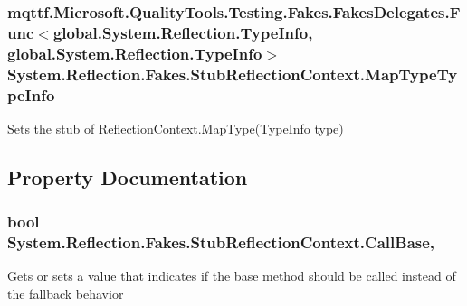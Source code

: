 \hypertarget{class_system_1_1_reflection_1_1_fakes_1_1_stub_reflection_context_a1d6b6e2142724c81acddba1c57b04350}{
\subsubsection[{Map\-Type\-Type\-Info}]{\setlength{\rightskip}{0pt plus 5cm}mqttf.\-Microsoft.\-Quality\-Tools.\-Testing.\-Fakes.\-Fakes\-Delegates.\-Func$<$global.\-System.\-Reflection.\-Type\-Info, global.\-System.\-Reflection.\-Type\-Info$>$ System.\-Reflection.\-Fakes.\-Stub\-Reflection\-Context.\-Map\-Type\-Type\-Info}}\label{class_system_1_1_reflection_1_1_fakes_1_1_stub_reflection_context_a1d6b6e2142724c81acddba1c57b04350}


Sets the stub of Reflection\-Context.\-Map\-Type(\-Type\-Info type)



\subsection{Property Documentation}
\hypertarget{class_system_1_1_reflection_1_1_fakes_1_1_stub_reflection_context_af18c2b3adf7cdf37a3f920e8a7fe58bb}{
\subsubsection[{Call\-Base}]{\setlength{\rightskip}{0pt plus 5cm}bool System.\-Reflection.\-Fakes.\-Stub\-Reflection\-Context.\-Call\-Base\hspace{0.3cm}{\ttfamily [get]}, {\ttfamily [set]}}}\label{class_system_1_1_reflection_1_1_fakes_1_1_stub_reflection_context_af18c2b3adf7cdf37a3f920e8a7fe58bb}


Gets or sets a value that indicates if the base method should be called instead of the fallback behavior

